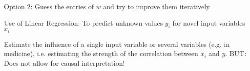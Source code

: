 \documentclass[landscape, a4paper]{article}
\begin{document}
\begin{minipage}[t]{0.2\linewidth}
\begin{betterlist}
\begin{betterlist}
\begin{betterlist}
\begin{betterlist}
\begin{betterlist}
					\end{betterlist}
				\end{betterlist}
				\item \alert{Option 2:} Guess the entries of $w$ and try to improve them iteratively
				\begin{betterlist}
					\item \alert{Use of Linear Regression:} To predict unknown values $y_i$ for novel input variables $x_i$
          \begin{betterlist}
            \item Estimate the influence of a single input variable or several variables (e.g. in medicine), i.e. estimating the strength of the \alert{correlation} between $x_i$ and $y$. \alert{BUT: Does not allow for causal interpretation!}
          \end{betterlist}
				\end{betterlist}
			\end{betterlist}
		\end{betterlist}

\end{betterlist}
\end{minipage}
\end{document}
